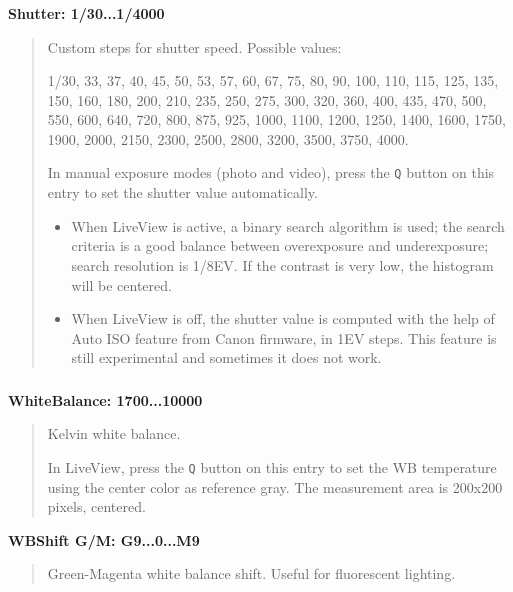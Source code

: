 \documentclass[a4paper,english]{article}
\begin{document}
\vspace{-10mm}\subsubsection*{}\label{shutter}
\textbf{Shutter: 1/30...1/4000}
%
\begin{quote}

Custom steps for shutter speed. Possible values:

1/30, 33, 37, 40, 45, 50, 53, 57, 60, 67, 75, 80, 90, 100, 110, 115, 125, 135, 150, 160,
180, 200, 210, 235, 250, 275, 300, 320, 360, 400, 435, 470, 500, 550, 600, 640, 720, 800,
875, 925, 1000, 1100, 1200, 1250, 1400, 1600, 1750, 1900, 2000, 2150, 2300, 2500, 2800, 3200,
3500, 3750, 4000.

In manual exposure modes (photo and video), press the \texttt{Q} button on this entry to set the shutter value automatically.
%
\begin{itemize}

\item When LiveView is active, a binary search algorithm is used; the search criteria is a good balance between overexposure and underexposure; search resolution is 1/8EV. If the contrast is very low, the histogram will be centered.

\item When LiveView is off, the shutter value is computed with the help of Auto ISO feature from Canon firmware, in 1EV steps. This feature is still experimental and sometimes it does not work.

\end{itemize}

\end{quote}
\vspace{-10mm}\subsubsection*{}\label{kelvin-white-balance}
\textbf{WhiteBalance: 1700...10000}
%
\begin{quote}

Kelvin white balance.

In LiveView, press the \texttt{Q} button on this entry to set the WB temperature using the center color as reference gray. The measurement area is 200x200 pixels, centered.

\end{quote}

\textbf{WBShift G/M: G9...0...M9}
%
\begin{quote}

Green-Magenta white balance shift. Useful for fluorescent lighting.

\end{quote}
\end{document}
